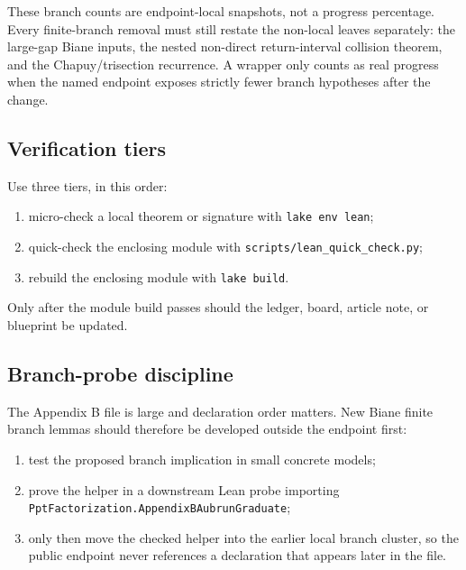 \documentclass[
]{article}
\providecommand{\tightlist}{%
  \setlength{\itemsep}{0pt}\setlength{\parskip}{0pt}}
\begin{document}
These branch counts are endpoint-local snapshots, not a progress
percentage. Every finite-branch removal must still restate the non-local
leaves separately: the large-gap Biane inputs, the nested non-direct
return-interval collision theorem, and the Chapuy/trisection recurrence.
A wrapper only counts as real progress when the named endpoint exposes
strictly fewer branch hypotheses after the change.

\subsection{Verification tiers}\label{verification-tiers}

Use three tiers, in this order:

\begin{enumerate}
\def\labelenumi{\arabic{enumi}.}
\tightlist
\item
  micro-check a local theorem or signature with
  \texttt{lake\ env\ lean};
\item
  quick-check the enclosing module with
  \texttt{scripts/lean\_quick\_check.py};
\item
  rebuild the enclosing module with \texttt{lake\ build}.
\end{enumerate}

Only after the module build passes should the ledger, board, article
note, or blueprint be updated.

\subsection{Branch-probe discipline}\label{branch-probe-discipline}

The Appendix B file is large and declaration order matters. New Biane
finite branch lemmas should therefore be developed outside the endpoint
first:

\begin{enumerate}
\def\labelenumi{\arabic{enumi}.}
\tightlist
\item
  test the proposed branch implication in small concrete models;
\item
  prove the helper in a downstream Lean probe importing
  \texttt{PptFactorization.AppendixBAubrunGraduate};
\item
  only then move the checked helper into the earlier local branch
  cluster, so the public endpoint never references a declaration that
  appears later in the file.
\end{enumerate}
\end{document}

